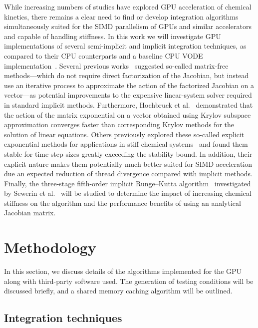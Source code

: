 \documentclass[preprint]{elsarticle}
\begin{document}
While increasing numbers of studies have explored GPU acceleration of chemical kinetics, there remains a clear need to find or develop integration algorithms simultaneously suited for the SIMD parallelism of GPUs and similar accelerators and capable of handling stiffness.
In this work we will investigate GPU implementations of several semi-implicit and implicit integration techniques, as compared to their CPU counterparts and a baseline CPU VODE implementation~\cite{Hindmarsh:2005hg}.
Several previous works~\cite{Perini20141180,McNenly2015581} suggested so-called matrix-free methods---which do not require direct factorization of the Jacobian, but instead use an iterative process to approximate the action of the factorized Jacobian on a vector---as potential improvements to the expensive linear-system solver required in standard implicit methods.
Furthermore, Hochbruck et al.~\cite{Hochbruck:1997} demonstrated that the action of the matrix exponential on a vector obtained using Krylov subspace approximation converges faster than corresponding Krylov methods for the solution of linear equations.
Others previously explored these so-called explicit exponential methods for applications in stiff chemical systems~\cite{Bisetti:2012jw,falati2011integration} and found them stable for time-step sizes greatly exceeding the stability bound.
In addition, their explicit nature makes them potentially much better suited for SIMD acceleration due an expected reduction of thread divergence compared with implicit methods.
Finally, the three-stage fifth-order implicit Runge--Kutta algorithm~\cite{wanner1991solving} investigated by Sewerin et al.~\cite{Sewerin20151375} will be studied to determine the impact of increasing chemical stiffness on the algorithm and the performance benefits of using an analytical Jacobian matrix.

\section{Methodology}
\label{sec:Method}

In this section, we discuss details of the algorithms implemented for the GPU along with third-party software used.
The generation of testing conditions will be discussed briefly, and a shared memory caching algorithm will be outlined.

\subsection{Integration techniques}
\end{document}
